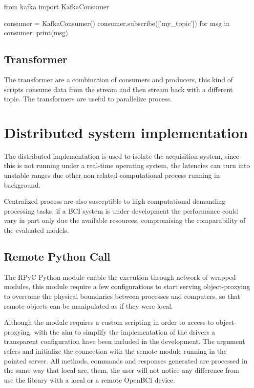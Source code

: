 \begin{python}
from kafka import KafkaConsumer

consumer = KafkaConsumer()
consumer.subscribe(['my_topic'])
for msg in consumer:
    print(msg)
\end{python}

\subsection{Transformer}

The transformer are a combination of consumers and producers, this kind of scripts consume data from the stream and then stream back with a different topic. The transformers are useful to parallelize process.


\section{Distributed system implementation}

The distributed implementation is used to isolate the acquisition system, since this is not running under a real-time operating system, the latencies can turn into unstable ranges due other non related computational process running in background. 

Centralized process are also susceptible to high computational demanding processing tasks, if a BCI system is under development the performance could vary in part only due the available resources, compromising the comparability of the evaluated models.

\subsection{Remote Python Call}

The \gls*{RPyC} Python module enable the execution through network of wrapped modules, this module require a few configurations to start serving object-proxying to overcome the physical boundaries between processes and computers, so that remote objects can be manipulated as if they were local.

Although the module requires a custom scripting in order to access to object-proxying, with the aim to simplify the implementation of the drivers a transparent configuration have been included in the development. The argument  refers and initialize the connection with the remote module running in the pointed server. All methods, commands and responses generated are processed in the same way that local are, them, the user will not notice any difference from use the library with a local or a remote OpenBCI device. 

